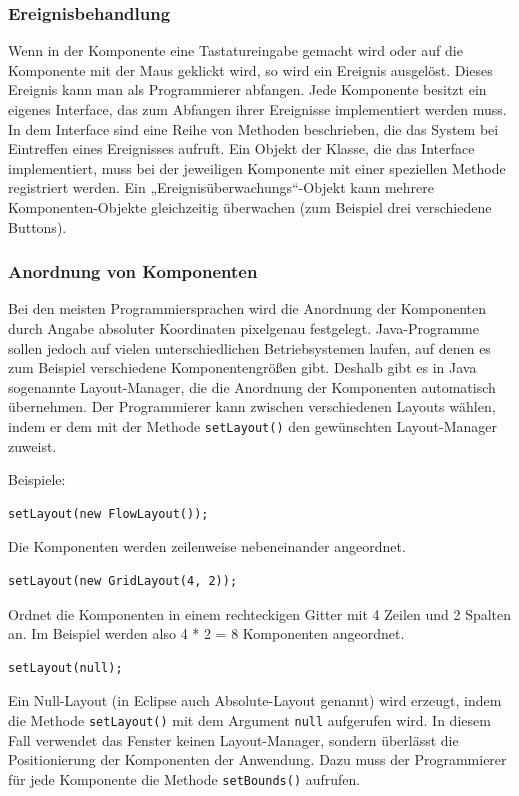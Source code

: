 \subsubsection{Ereignisbehandlung}

Wenn in der Komponente eine Tastatureingabe gemacht wird oder auf die Komponente
mit der Maus geklickt wird, so wird ein Ereignis ausgelöst. Dieses Ereignis
kann man als Programmierer abfangen. Jede Komponente besitzt ein eigenes
Interface, das zum Abfangen ihrer Ereignisse implementiert werden muss. In dem
Interface sind eine Reihe von Methoden beschrieben, die das System bei
Eintreffen eines Ereignisses aufruft. Ein Objekt der Klasse, die das Interface
implementiert, muss bei der jeweiligen Komponente mit einer speziellen Methode
registriert werden. Ein „Ereignisüberwachungs“-Objekt kann mehrere
Komponenten-Objekte gleichzeitig überwachen (zum Beispiel drei verschiedene
Buttons).

\subsubsection{Anordnung von Komponenten}

Bei den meisten Programmiersprachen wird die Anordnung der Komponenten durch
Angabe absoluter Koordinaten pixelgenau festgelegt. Java-Programme sollen
jedoch auf vielen unterschiedlichen Betriebsystemen laufen, auf denen es zum
Beispiel verschiedene Komponentengrößen gibt. Deshalb gibt es in Java sogenannte
Layout-Manager, die die Anordnung der Komponenten automatisch übernehmen. Der
Programmierer kann zwischen verschiedenen Layouts wählen, indem er dem
 mit der Methode \lstinline|setLayout()| den gewünschten
Layout-Manager zuweist.

Beispiele:

\begin{compactenum}[a)]
\item
\begin{lstlisting}
setLayout(new FlowLayout());
\end{lstlisting}
Die Komponenten werden zeilenweise nebeneinander angeordnet.

\item
\begin{lstlisting}
setLayout(new GridLayout(4, 2));
\end{lstlisting}
Ordnet die Komponenten in einem rechteckigen Gitter mit 4 Zeilen und 2 Spalten
an. Im Beispiel werden also 4 * 2 = 8 Komponenten angeordnet.

\item
\begin{lstlisting}
setLayout(null);
\end{lstlisting}
Ein Null-Layout (in Eclipse auch Absolute-Layout genannt) wird erzeugt, indem
die Methode \lstinline|setLayout()| mit dem Argument \lstinline|null| aufgerufen
wird. In diesem Fall verwendet das Fenster keinen Layout-Manager, sondern
überlässt die Positionierung der Komponenten der Anwendung. Dazu muss der
Programmierer für jede Komponente die Methode \lstinline|setBounds()| aufrufen.
\end{compactenum}

